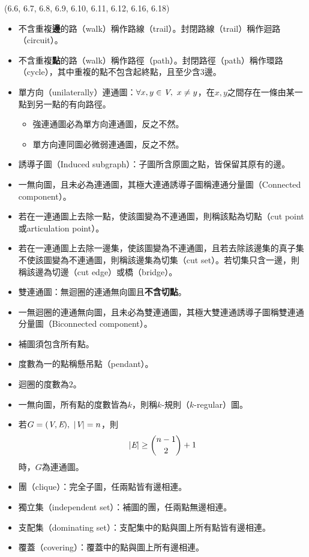 \item \begin{theorem}{(6.6, 6.7, 6.8, 6.9, 6.10, 6.11, 6.12, 6.16, 6.18)} \quad\quad
    \begin{itemize}
        \item 不含重複\textbf{邊}的路（walk）稱作路線（trail）。封閉路線（trail）稱作迴路（circuit）。
        \item 不含重複\textbf{點}的路（walk）稱作路徑（path）。封閉路徑（path）稱作環路（cycle），其中重複的點不包含起終點，且至少含$3$邊。
        \item 單方向（unilaterally）連通圖：$\forall x, y \in \textit{V}, \ x \neq y$，在$x, y$之間存在一條由某一點到另一點的有向路徑。
        \begin{itemize}
            \item 強連通圖必為單方向連通圖，反之不然。
            \item 單方向連同圖必微弱連通圖，反之不然。
        \end{itemize}
        \item 誘導子圖（Induced subgraph）：子圖所含原圖之點，皆保留其原有的邊。
        \item 一無向圖，且未必為連通圖，其極大連通誘導子圖稱連通分量圖（Connected component）。
        \item 若在一連通圖上去除一點，使該圖變為不連通圖，則稱該點為切點（cut point或articulation point）。
        \item 若在一連通圖上去除一邊集，使該圖變為不連通圖，且若去除該邊集的真子集不使該圖變為不連通圖，則稱該邊集為切集（cut set）。若切集只含一邊，則稱該邊為切邊（cut edge）或橋（bridge）。
        \item 雙連通圖：無迴圈的連通無向圖且\textbf{不含切點}。
        \item 一無迴圈的連通無向圖，且未必為雙連通圖，其極大雙連通誘導子圖稱雙連通分量圖（Biconnected component）。
        \item 補圖須包含所有點。
        \item 度數為一的點稱懸吊點（pendant）。
        \item 迴圈的度數為$2$。
        \item 一無向圖，所有點的度數皆為$k$，則稱$k$-規則（$k$-regular）圖。
        \item 若$G = (\textit{V}, \textit{E}), \ |\textit{V}| = n$，則\begin{equation}
            |\textit{E}| \ge \binom{n - 1}{2} + 1
        \end{equation}
        時，$G$為連通圖。
        \item 團（clique）：完全子圖，任兩點皆有邊相連。
        \item 獨立集（independent set）：補圖的團，任兩點無邊相連。
        \item 支配集（dominating set）：支配集中的點與圖上所有點皆有邊相連。
        \item 覆蓋（covering）：覆蓋中的點與圖上所有邊相連。
    \end{itemize}
\end{theorem}

